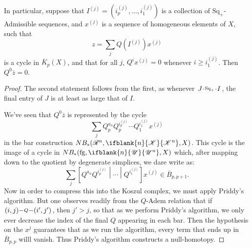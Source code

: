 \documentclass[10pt]{article}
\makeatletter
\newcommand{\PRLie}[1]{\scrR^{#1}}%
\newcommand{\LL}[1]{\ifblank{#1}{\scrK}{\scrK^{#1}}}
\newcommand{\nontop}[1]{\ifblank{#1}{\scrU}{\scrU^{#1}}}
\newcommand{\produces}[3]{{#1}{#3}{#2}}
\newcommand{\forget}{\mathrm{fg}}
\renewcommand{\Q}{Q}
\newcommand{\SqShift}{\Sq_{+}}
\newcommand{\Sq}{\mathrm{Sq}}
\renewcommand{\produces}[3]{
{
\def\labelstyle{\scriptstyle}
\xymatrix@C=2em@1{
{#1}
\ar@{-}[r]|-{{\,#3\,}}
&%
{#2}%
}}}
\makeatother
\begin{document}
\begin{LieLambdaStructureOnKoszul}
\begin{lem}
In particular, suppose that $I^{(j)}=(i^{(j)}_{p},\ldots,i^{(j)}_{1})$ is a collection of $\SqShift$-Admissible sequences, and $x^{(j)}$ is a sequence of homogeneous elements of $X$, such that
\[z=\sum_{j}Q(I^{(j)})x^{(j)}\]
is a cycle in $\overline{K}_p(X)$, and that for all $j$, $\Q^ix^{(j)}=0$ whenever $i\geq i^{{(j)}}_1$. Then $\Q^0\overline{z}=0$.
\end{lem}
\begin{proof}
The second statement follows from the first, as whenever $\produces{J}{I}{\SqShift}$, the final entry of $J$ is at least as large that of $I$.

We've seen that $\Q^0\overline{z}$ is represented by the cycle
\[\sum_{j}\Q^{a_n}_p\Q^{i^{{(j)}}_p}_p\cdots \Q^{i^{{(j)}}_1}_1x^{(j)}\]
in the bar construction $N{B_*}(\PRLie{n},\LL{n},X)$. This cycle is the image of a cycle in $NB_*(\forget,\nontop{n},X)$ which, after mapping down to the quotient by degenerate simplices, we dare write as:
\[\sum_{j}\left[\Q^{a_n}\Q^{i^{{(j)}}_p}\middle|\cdots \middle|\Q^{i^{{(j)}}_1}\right]x^{(j)}\in\overline{B}_{p,p+1}.\]
Now in order to compress this into the Koszul complex, we must apply Priddy's algorithm. But one observes readily from the $\Q$-Adem relation that if $\produces{(i,j)}{(i',j')}{\Q}$, then $j'>j$, so that as we perform Priddy's algorithm, we only ever decrease the index of the final $\Q$ appearing in each bar. Then the hypothesis on the $x^{{j}}$ guarantees that as we run the algorithm, every term that ends up in $\overline{B}_{p,p}$ willl vanish. Thus Priddy's algorithm constructs a null-homotopy.
\end{proof}

\end{LieLambdaStructureOnKoszul}
\end{document}
